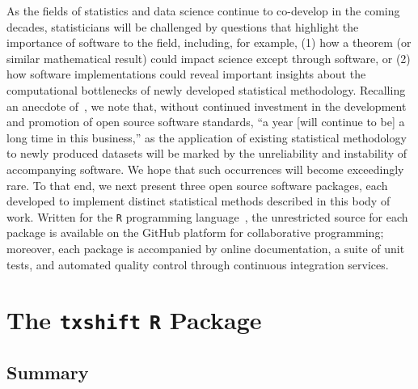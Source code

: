 As the fields of statistics and data science continue to co-develop in the
coming decades, statisticians will be challenged by questions that highlight the
importance of software to the field, including, for example, (1) how a theorem
(or similar mathematical result) could impact science except through software,
or (2) how software implementations could reveal important insights about the
computational bottlenecks of newly developed statistical methodology. Recalling
an anecdote of~\citet{buckheit1995wavelab}, we note that, without continued
investment in the development and promotion of open source software standards,
``a year [will continue to be] a long time in this business,'' as the
application of existing statistical methodology to newly produced datasets will
be marked by the unreliability and instability of accompanying software. We hope
that such occurrences will become exceedingly rare. To that end, we next present
three open source software packages, each developed to implement distinct
statistical methods described in this body of work. Written for the \texttt{R}
programming language~\citep{R}, the unrestricted source for each package is
available on the GitHub platform for collaborative programming; moreover, each
package is accompanied by online documentation, a suite of unit tests, and
automated quality control through continuous integration services.

\section{The \texttt{txshift} \texttt{R} Package}\label{pkg_txshift}

\subsection{Summary}

